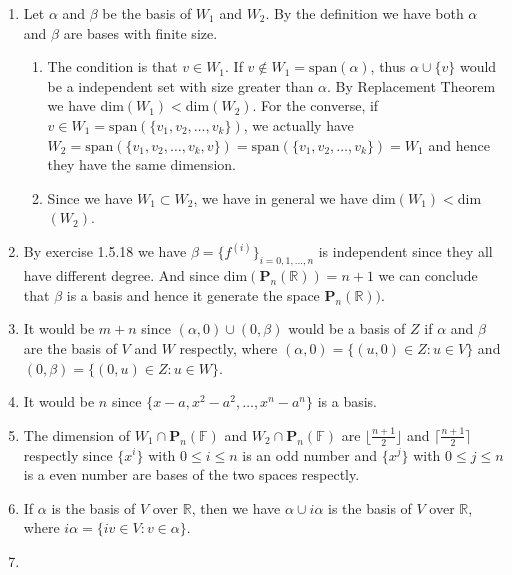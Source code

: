 \begin{enumerate}
\item Let $\alpha $ and $\beta $ be the basis of $W_1$ and $W_2$. By the definition we have both $\alpha $ and $\beta $ are bases with finite size.

\begin{enumerate}
\item The condition is that $v\in W_1$. If $v\notin W_1=\mathrm{span}(\alpha )$, thus $\alpha \cup \{v\}$ would be a independent set with size greater than $\alpha $. By Replacement Theorem we have dim$(W_1)<$dim$(W_2)$. For the converse, if $v\in W_1=\mathrm{span}(\{v_1,v_2,\ldots ,v_k\})$, we actually have $W_2=\mathrm{span}(\{v_1,v_2,\ldots ,v_k,v\})=\mathrm{span}(\{v_1,v_2,\ldots ,v_k\})=W_1$ and hence they have the same dimension.
\item Since we have $W_1\subset W_2$, we have in general we have dim$(W_1)<$dim$(W_2)$.
\end{enumerate}
\item By exercise 1.5.18 we have $\beta =\{f^{(i)}\}_{i=0,1,\ldots ,n}$ is independent since they all have different degree. And since dim$(\mathbf{P}_n(\mathbb{R}))=n+1$ we can conclude that $\beta $ is a basis and hence it generate the space $\mathbf{P}_n(\mathbb{R}))$.
\item It would be $m+n$ since $(\alpha ,0) \cup (0, \beta )$ would be a basis of $Z$ if $\alpha $ and $\beta $ are the basis of $V$ and $W$ respectly, where $(\alpha ,0)=\{(u,0)\in Z: u\in V\}$ and $(0, \beta )=\{(0,u)\in Z: u\in W\}$.
\item It would  be $n$ since $\{x-a,x^2-a^2,\ldots ,x^n-a^n\}$ is a basis.
\item The dimension of $W_1\cap \mathbf{P}_n(\mathbb{F})$ and $W_2\cap \mathbf{P}_n(\mathbb{F})$ are $\lfloor \frac{n+1}{2} \rfloor $ and $\lceil \frac{n+1}{2} \rceil $ respectly since $\{x^i\}$ with $0\leq i\leq n$ is an odd number and $\{x^j\}$ with $0\leq j\leq n$ is a even number are bases of the two spaces respectly.
\item If $\alpha $ is the basis of $V$ over $\mathbb{R}$, then we have $\alpha \cup i\alpha $ is the basis of $V$ over $\mathbb{R}$, where $i\alpha =\{iv\in V: v\in \alpha \}$.
\item \begin{enumerate}

\end{enumerate}
\end{enumerate}
